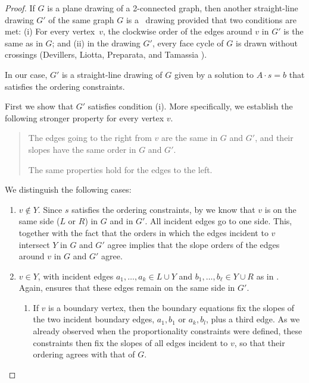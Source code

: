 \begin{proof}
	If $G$ is a plane drawing of a 2-connected graph, then another
	straight-line drawing $G'$ of the same graph $G$ is a \Fary\ drawing provided
	that two conditions are met:
	(i) For every vertex~$v$, the clockwise order of the
	edges around $v$ in $G'$ is the same as in $G$; and
	(ii) in the drawing $G'$, every face cycle of $G$ is drawn without crossings
	(Devillers, Liotta, Preparata, and Tamassia \cite[Lemma~16]{devillers.liotta.ea:checking}).
	
	In our case, $G'$ is a straight-line drawing of $G$ given by a solution
	to $A\cdot s = b$ that satisfies the ordering constraints.  


	First we show that $G'$ satisfies condition (i).
        More specifically, we establish the following stronger
        property for every vertex $v$.
\begin{quote}
  \thetag{$*$}
The edges going to the right from $v$ are the same in $G$ and $G'$,
and their slopes have the same order in $G$ and $G'$.

The same properties hold for the edges to the left.
\end{quote}

      
        We distinguish the following cases:
	\begin{enumerate}
		\item $v\not\in Y$. Since $s$ satisfies the ordering
                  constraints, by  we know that
                  $v$ is on the same side ($L$ or $R$)
                  in $G$ and
                  in $G'$.
All incident edges go to one side.
                  This, together with the fact that the
                  orders in which the edges incident to $v$ intersect
                  $Y$ in $G$ and $G'$ agree implies that the
                  slope orders of the edges around $v$ in $G$ and $G'$ agree.
		
		\item
		$v\in Y$, with incident edges $a_1,\ldots,a_k\in
		L\cup Y$ and $b_1,\ldots,b_\ell\in Y\cup R$ as in
                .
                Again,  ensures that
                these edges remain on the same side in $G'$.

\begin{enumerate}
\item If $v$ is a boundary vertex, %
  then the boundary equations fix the slopes of the two incident
  boundary edges, $a_1, b_1$ or $a_k, b_l$, plus a third edge.  As we
  already observed when the proportionality constraints were defined,
  these constraints then fix the slopes of all edges incident to $v$,
  so that their ordering agrees with that of $G$.
			

\end{enumerate}
\end{enumerate}
\end{proof}
